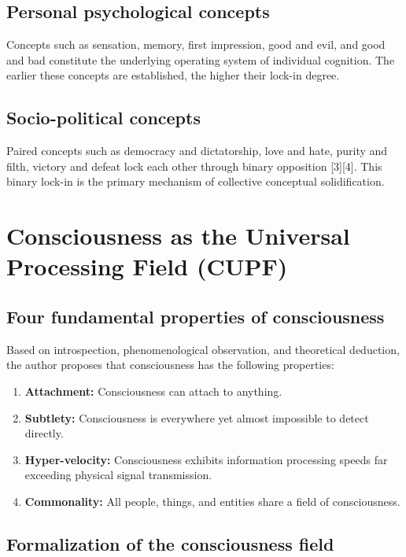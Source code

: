 \documentclass[11pt,a4paper]{article}
\begin{document}
\subsection{Personal psychological concepts}

Concepts such as sensation, memory, first impression, good and evil, and good and bad constitute the underlying operating system of individual cognition. The earlier these concepts are established, the higher their lock-in degree.

\subsection{Socio-political concepts}

Paired concepts such as democracy and dictatorship, love and hate, purity and filth, victory and defeat lock each other through binary opposition [3][4]. This binary lock-in is the primary mechanism of collective conceptual solidification.

\section{Consciousness as the Universal Processing Field (CUPF)}

\subsection{Four fundamental properties of consciousness}

Based on introspection, phenomenological observation, and theoretical deduction, the author proposes that consciousness has the following properties:
\begin{enumerate}
    \item \textbf{Attachment:} Consciousness can attach to anything.
    \item \textbf{Subtlety:} Consciousness is everywhere yet almost impossible to detect directly.
    \item \textbf{Hyper-velocity:} Consciousness exhibits information processing speeds far exceeding physical signal transmission.
    \item \textbf{Commonality:} All people, things, and entities share a field of consciousness.
\end{enumerate}

\subsection{Formalization of the consciousness field}
\end{document}
